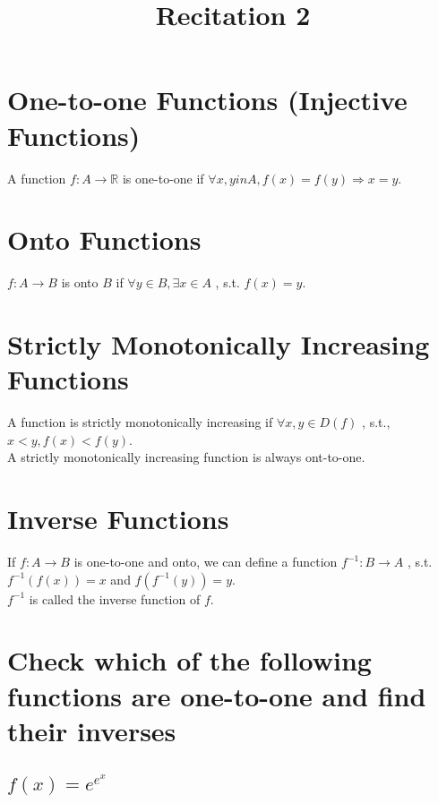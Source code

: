 \documentclass[fleqn]{article}
\title{Recitation 2}
\author{}
\date{\formatdate{5}{11}{2014}}
\begin{document}
\maketitle
\setlength{\mathindent}{0pt}

\tableofcontents

\newpage
\section{One-to-one Functions (Injective Functions)}

A function $f : A \rightarrow \mathbb{R}$ is one-to-one if $\forall x, y in A, f(x) = f(y) \Rightarrow x = y$.

\section{Onto Functions}

$f : A \rightarrow B$ is onto $B$ if $\forall y \in B, \exists x \in A$ , s.t. $f(x) = y$.

\section{Strictly Monotonically Increasing Functions}

A function is strictly monotonically increasing if $\forall x, y \in D(f)$ , s.t., $x < y, f(x) < f(y)$.\\
A strictly monotonically increasing function is always ont-to-one.

\section{Inverse Functions}

If $f : A \rightarrow B$ is one-to-one and onto, we can define a function $f^{-1} : B \rightarrow A$ , s.t. $f^{-1}(f(x)) = x$ and $f(f^{-1}(y)) = y$.\\
$f^{-1}$ is called the inverse function of $f$.

\section{Check which of the following functions are one-to-one and find their inverses}

\subsection{$f(x) = e^{e^x}$}
\end{document}
